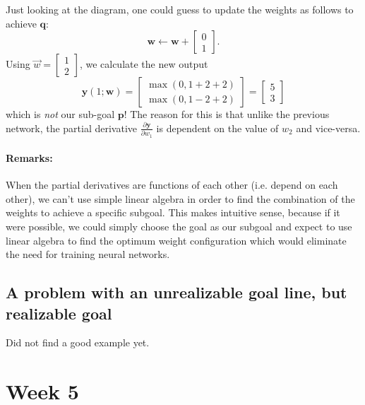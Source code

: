\documentclass{article}
\let\vec\mathbf
\begin{document}
Just looking at the diagram, one could guess to update the weights as follows to achieve $\vec{q}$:
\begin{equation*}
    \vec{w} \leftarrow \vec{w} +
    \begin{bmatrix}
        0 \\
        1
    \end{bmatrix}.
\end{equation*}
Using $\Vec{w} = \begin{bmatrix} 1 \\ 2 \end{bmatrix}$, we calculate the new output
\begin{equation*}
    \vec{y}(1; \vec{w})
    = 
    \begin{bmatrix}
        \max \left( 0, 1 + 2 + 2 \right) \\
        \max \left( 0, 1 - 2 + 2 \right)
    \end{bmatrix}
    =
    \begin{bmatrix}
        5 \\
        3
    \end{bmatrix}
\end{equation*}
which is \textit{not} our sub-goal $\vec{p}$! The reason for this is that unlike the previous network, the partial derivative $\frac{\partial \vec{y}}{\partial w_1}$ is dependent on the value of $w_2$ and vice-versa.

\paragraph{Remarks:}
When the partial derivatives are functions of each other (i.e. depend on each other), we can't use simple linear algebra in order to find the combination of the weights to achieve a specific subgoal. 
This makes intuitive sense, because if it were possible, we could simply choose the goal as our subgoal and expect to use linear algebra to find the optimum weight configuration which would eliminate the need for training neural networks.

\subsection{A problem with an unrealizable goal line, but realizable goal}
Did not find a good example yet.


\section{Week 5}
\end{document}

